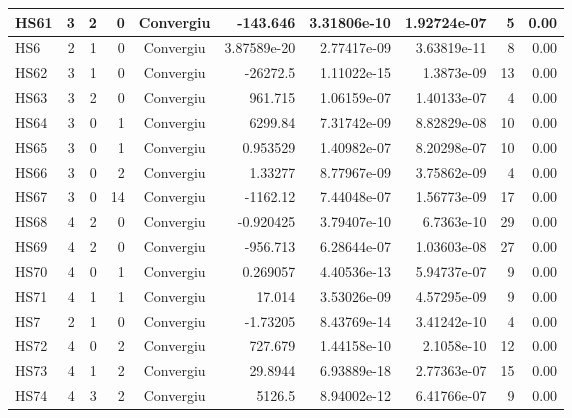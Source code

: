 \begin{center}
\begin{longtable}{|l|r|r|r|c|r|r|r|r|r|}
    HS61 &      3 &      2 &      0 & Convergiu  &    -143.646 &    3.31806e-10 & 1.92724e-07 &      5 &    0.00 \\ \hline
     HS6 &      2 &      1 &      0 & Convergiu  & 3.87589e-20 &    2.77417e-09 & 3.63819e-11 &      8 &    0.00 \\ \hline
    HS62 &      3 &      1 &      0 & Convergiu  &    -26272.5 &    1.11022e-15 &  1.3873e-09 &     13 &    0.00 \\ \hline
    HS63 &      3 &      2 &      0 & Convergiu  &     961.715 &    1.06159e-07 & 1.40133e-07 &      4 &    0.00 \\ \hline
    HS64 &      3 &      0 &      1 & Convergiu  &     6299.84 &    7.31742e-09 & 8.82829e-08 &     10 &    0.00 \\ \hline
    HS65 &      3 &      0 &      1 & Convergiu  &    0.953529 &    1.40982e-07 & 8.20298e-07 &     10 &    0.00 \\ \hline
    HS66 &      3 &      0 &      2 & Convergiu  &     1.33277 &    8.77967e-09 & 3.75862e-09 &      4 &    0.00 \\ \hline
    HS67 &      3 &      0 &     14 & Convergiu  &    -1162.12 &    7.44048e-07 & 1.56773e-09 &     17 &    0.00 \\ \hline
    HS68 &      4 &      2 &      0 & Convergiu  &   -0.920425 &    3.79407e-10 &  6.7363e-10 &     29 &    0.00 \\ \hline
    HS69 &      4 &      2 &      0 & Convergiu  &    -956.713 &    6.28644e-07 & 1.03603e-08 &     27 &    0.00 \\ \hline
    HS70 &      4 &      0 &      1 & Convergiu  &    0.269057 &    4.40536e-13 & 5.94737e-07 &      9 &    0.00 \\ \hline
    HS71 &      4 &      1 &      1 & Convergiu  &      17.014 &    3.53026e-09 & 4.57295e-09 &      9 &    0.00 \\ \hline
     HS7 &      2 &      1 &      0 & Convergiu  &    -1.73205 &    8.43769e-14 & 3.41242e-10 &      4 &    0.00 \\ \hline
    HS72 &      4 &      0 &      2 & Convergiu  &     727.679 &    1.44158e-10 &  2.1058e-10 &     12 &    0.00 \\ \hline
    HS73 &      4 &      1 &      2 & Convergiu  &     29.8944 &    6.93889e-18 & 2.77363e-07 &     15 &    0.00 \\ \hline
    HS74 &      4 &      3 &      2 & Convergiu  &      5126.5 &    8.94002e-12 & 6.41766e-07 &      9 &    0.00 \\ \hline

\end{longtable}
\end{center}
